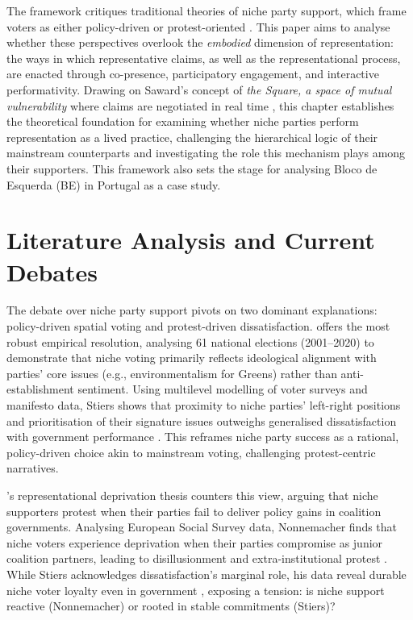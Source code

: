 The framework critiques traditional theories of niche party support, which frame voters as either policy-driven or protest-oriented \parencite{meguid2005, nonnemacher2023}. This paper aims to analyse whether these perspectives overlook the \textit{embodied} dimension of representation: the ways in which representative claims, as well as the representational process, are enacted through co-presence, participatory engagement, and interactive performativity. Drawing on Saward’s concept of \textit{the Square, a space of mutual vulnerability} where claims are negotiated in real time \parencite[5]{saward2024}, this chapter establishes the theoretical foundation for examining whether niche parties perform representation as a lived practice, challenging the hierarchical logic of their mainstream counterparts and investigating the role this mechanism plays among their supporters. This framework also sets the stage for analysing Bloco de Esquerda (BE) in Portugal as a case study.

\section{Literature Analysis and Current Debates}\label{sec:Literature Analysis and Current Debates} %
The debate over niche party support pivots on two dominant explanations: policy-driven spatial voting and protest-driven dissatisfaction. \textcite{stiers2024} offers the most robust empirical resolution, analysing 61 national elections (2001–2020) to demonstrate that niche voting primarily reflects ideological alignment with parties' core issues (e.g., environmentalism for Greens) rather than anti-establishment sentiment. Using multilevel modelling of voter surveys and manifesto data, Stiers shows that proximity to niche parties' left-right positions and prioritisation of their signature issues outweighs generalised dissatisfaction with government performance \parencite[5-6]{stiers2024}. This reframes niche party success as a rational, policy-driven choice akin to mainstream voting, challenging protest-centric narratives.

\textcite{nonnemacher2023}'s representational deprivation thesis counters this view, arguing that niche supporters protest when their parties fail to deliver policy gains in coalition governments. Analysing European Social Survey data, Nonnemacher finds that niche voters experience deprivation when their parties compromise as junior coalition partners, leading to disillusionment and extra-institutional protest \parencite[31]{nonnemacher2023}. While Stiers acknowledges dissatisfaction’s marginal role, his data reveal durable niche voter loyalty even in government \parencite[10]{stiers2024}, exposing a tension: is niche support reactive (Nonnemacher) or rooted in stable commitments (Stiers)?

